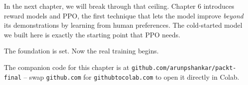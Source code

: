 \begin{chapterenv}
In the next chapter, we will break through that ceiling. Chapter 6 introduces reward models and PPO, the first technique that lets the model improve \textit{beyond} its demonstrations by learning from human preferences. The cold-started model we built here is exactly the starting point that PPO needs.

The foundation is set. Now the real training begins.

The companion code for this chapter is at \texttt{github.com/arunpshankar/packt-final} -- swap \texttt{github.com} for \texttt{githubtocolab.com} to open it directly in Colab.

\end{chapterenv}